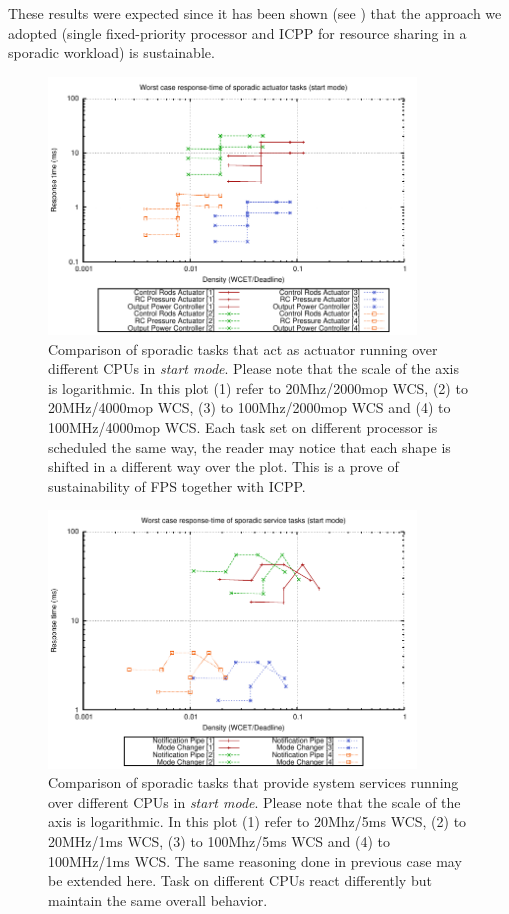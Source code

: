 \documentclass[10pt,a4paper]{report}
\begin{document}
These results were expected since it has been shown (see \cite{burns08}) that 
the approach we adopted (single fixed-priority processor and ICPP for resource 
sharing in a sporadic workload) is sustainable. 
\begin{figure}[p]
\centering
\includegraphics[width=0.87\textwidth]{plots/sust_sporadic_act}
\caption{
    Comparison of sporadic tasks that act as actuator running over different CPUs
    in \emph{start mode}. Please note that the scale of the axis is 
    logarithmic. In this plot (1) refer to 20Mhz/2000mop WCS, (2) to 20MHz/4000mop WCS, 
    (3) to 100Mhz/2000mop WCS and (4) to 100MHz/4000mop WCS.
    Each task set on different processor is scheduled the same way, the reader may
    notice that each shape is shifted in a different way over the plot. This is a
    prove of sustainability of FPS together with ICPP.
}
\label{fig:sporact}
\end{figure}

\begin{figure}[p]
\centering
\includegraphics[width=0.87\textwidth]{plots/sust_sporadic_ser}
\caption{
    Comparison of sporadic tasks that provide system services running over 
    different CPUs in \emph{start mode}. Please note that the scale of the
    axis is logarithmic. In this plot (1) refer to 20Mhz/5ms WCS, (2) to 
    20MHz/1ms WCS, (3) to 100Mhz/5ms WCS and (4) to 100MHz/1ms WCS. The same 
    reasoning done in previous case may be extended here. Task on different 
    CPUs react differently but maintain the same overall behavior. 
}
\label{fig:sporserv}
\end{figure}
\end{document}
